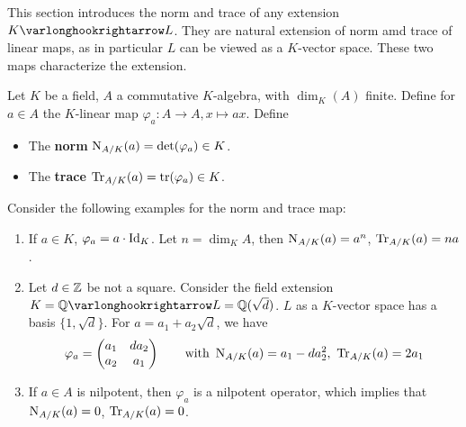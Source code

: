 \documentclass{article}
\begin{document}
\textstart
This section introduces the norm and trace of any extension $K \ext L$. They are natural extension of norm amd trace of linear maps, as in particular $L$ can be viewed as a $K$-vector space. These two maps characterize the extension.

\begin{definition}
    Let $K$ be a field, $A$ a commutative $K$-algebra, with $\dim_K(A)$ finite. Define for $a \in A$ the $K$-linear map $\varphi_a: A \to A, x \mapsto ax$. Define
    \begin{itemize}
        \item The \textbf{norm} $\operatorname{N}_{A/K}(a) = \det(\varphi_a) \in K$.
        \item The \textbf{trace} $\operatorname{Tr}_{A/K}(a) = \operatorname{tr}(\varphi_a) \in K$.
    \end{itemize}
\end{definition}

\begin{example}
    Consider the following examples for the norm and trace map:
    \begin{enumerate}[label=\arabic*)]
        \item If $a \in K$, $\varphi_a = a \cdot \mathrm{Id}_K$. Let $n = \dim_K A$, then $\operatorname{N}_{A/K}(a) = a^n$, $\operatorname{Tr}_{A/K}(a) = na$.
        \item Let $d \in \mathbb{Z}$ be not a square. Consider the field extension $K = \Q \ext L = \Q(\sqrt{d})$. $L$ as a $K$-vector space has a basis $\{1, \sqrt{d}\}$. For $a = a_1 + a_2 \sqrt{d}$, we have
        \[
            \varphi_a = 
            \begin{pmatrix}
                a_1 & d a_2 \\
                a_2 & a_1
            \end{pmatrix}
            \qquad \text{with}\ 
            \Norm_{A/K}(a) = a_1 - d a_2^2,\ \Tr_{A/K}(a) = 2a_1
        \]
        \item If $a \in A$ is nilpotent, then $\varphi_a$ is a nilpotent operator, which implies that $\operatorname{N}_{A/K}(a) = 0$, $\operatorname{Tr}_{A/K}(a) = 0$.
    \end{enumerate}
\end{example}
\end{document}
